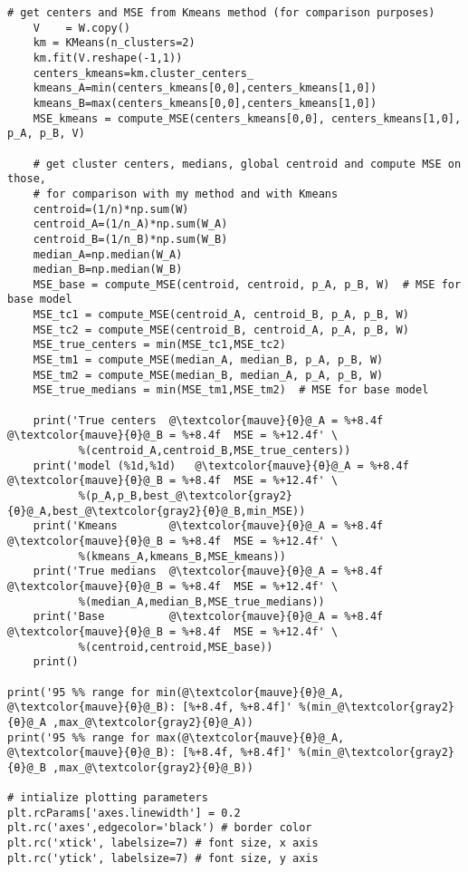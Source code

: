 \documentclass[oneside,10pt]{book}
\begin{document}
\begin{lstlisting}[escapechar=@]
    # get centers and MSE from Kmeans method (for comparison purposes)  
    V    = W.copy()  
    km = KMeans(n_clusters=2) 
    km.fit(V.reshape(-1,1))   
    centers_kmeans=km.cluster_centers_ 
    kmeans_A=min(centers_kmeans[0,0],centers_kmeans[1,0])
    kmeans_B=max(centers_kmeans[0,0],centers_kmeans[1,0])
    MSE_kmeans = compute_MSE(centers_kmeans[0,0], centers_kmeans[1,0], p_A, p_B, V)  

    # get cluster centers, medians, global centroid and compute MSE on those, 
    # for comparison with my method and with Kmeans
    centroid=(1/n)*np.sum(W) 
    centroid_A=(1/n_A)*np.sum(W_A) 
    centroid_B=(1/n_B)*np.sum(W_B) 
    median_A=np.median(W_A)
    median_B=np.median(W_B)
    MSE_base = compute_MSE(centroid, centroid, p_A, p_B, W)  # MSE for base model
    MSE_tc1 = compute_MSE(centroid_A, centroid_B, p_A, p_B, W)  
    MSE_tc2 = compute_MSE(centroid_B, centroid_A, p_A, p_B, W)  
    MSE_true_centers = min(MSE_tc1,MSE_tc2)  
    MSE_tm1 = compute_MSE(median_A, median_B, p_A, p_B, W)  
    MSE_tm2 = compute_MSE(median_B, median_A, p_A, p_B, W)  
    MSE_true_medians = min(MSE_tm1,MSE_tm2)  # MSE for base model

    print('True centers  @\textcolor{mauve}{θ}@_A = %+8.4f  @\textcolor{mauve}{θ}@_B = %+8.4f  MSE = %+12.4f' \
           %(centroid_A,centroid_B,MSE_true_centers)) 
    print('model (%1d,%1d)   @\textcolor{mauve}{θ}@_A = %+8.4f  @\textcolor{mauve}{θ}@_B = %+8.4f  MSE = %+12.4f' \
           %(p_A,p_B,best_@\textcolor{gray2}{θ}@_A,best_@\textcolor{gray2}{θ}@_B,min_MSE)) 
    print('Kmeans        @\textcolor{mauve}{θ}@_A = %+8.4f  @\textcolor{mauve}{θ}@_B = %+8.4f  MSE = %+12.4f' \
           %(kmeans_A,kmeans_B,MSE_kmeans)) 
    print('True medians  @\textcolor{mauve}{θ}@_A = %+8.4f  @\textcolor{mauve}{θ}@_B = %+8.4f  MSE = %+12.4f' \
           %(median_A,median_B,MSE_true_medians)) 
    print('Base          @\textcolor{mauve}{θ}@_A = %+8.4f  @\textcolor{mauve}{θ}@_B = %+8.4f  MSE = %+12.4f' \
           %(centroid,centroid,MSE_base)) 
    print()
 
print('95 %% range for min(@\textcolor{mauve}{θ}@_A, @\textcolor{mauve}{θ}@_B): [%+8.4f, %+8.4f]' %(min_@\textcolor{gray2}{θ}@_A ,max_@\textcolor{gray2}{θ}@_A))
print('95 %% range for max(@\textcolor{mauve}{θ}@_A, @\textcolor{mauve}{θ}@_B): [%+8.4f, %+8.4f]' %(min_@\textcolor{gray2}{θ}@_B ,max_@\textcolor{gray2}{θ}@_B))

# intialize plotting parameters
plt.rcParams['axes.linewidth'] = 0.2
plt.rc('axes',edgecolor='black') # border color
plt.rc('xtick', labelsize=7) # font size, x axis  
plt.rc('ytick', labelsize=7) # font size, y axis


\end{lstlisting}
\end{document}
